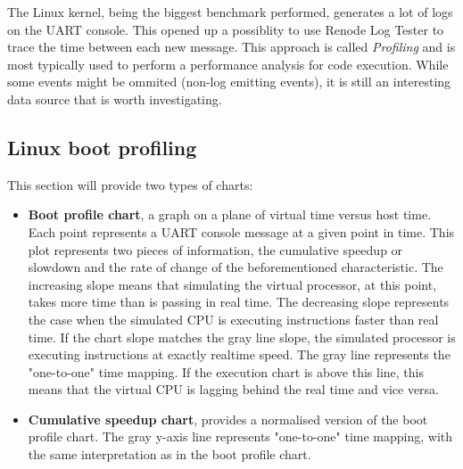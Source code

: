 \noindent
The Linux kernel, being the biggest benchmark performed, generates a lot of logs on the UART console. This opened up a
possiblity to use Renode Log Tester to trace the time between each new message. This approach is called
\textit{Profiling} and is most typically used to perform a performance analysis for code execution. While some events
might be ommited (non-log emitting events), it is still an interesting data source that is worth investigating.

\pagebreak

\subsection{Linux boot profiling}
This section will provide two types of charts:
\begin{itemize}
    \item{\textbf{Boot profile chart}, a graph on a plane of virtual time versus host time. Each point represents a
    UART console message at a given point in time. This plot represents two pieces of information, the cumulative
    speedup or slowdown and the rate of change of the beforementioned characteristic. The increasing slope means that
    simulating the virtual processor, at this point, takes more time than is passing in real time. The decreasing slope
    represents the case when the simulated CPU is executing instructions faster than real time. If the chart slope
    matches the gray line slope, the simulated processor is executing instructions at exactly realtime speed.
    The gray line represents the "one-to-one" time mapping. If the execution chart is above this line, this means
    that the virtual CPU is lagging behind the real time and vice versa.}
    \item{\textbf{Cumulative speedup chart}, provides a normalised version of the boot profile chart.
    The gray y-axis line represents "one-to-one" time mapping, with the same interpretation as in the boot profile
    chart.}
\end{itemize}

\pagebreak

